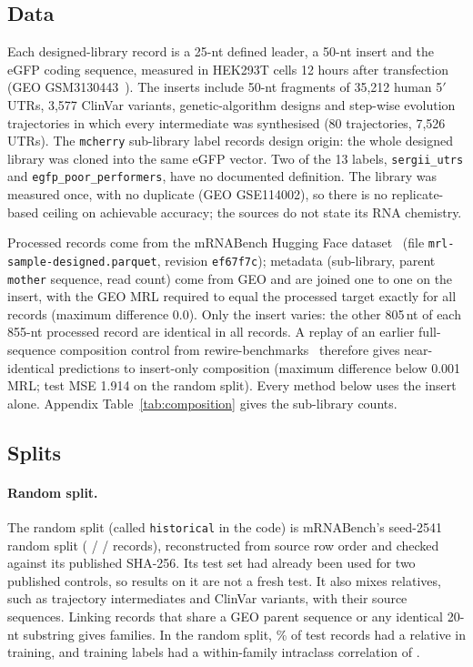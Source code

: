 \documentclass[11pt]{article}
\newcommand{\m}[1]{\texttt{#1}}
\begin{document}
\subsection{Data}\label{sec:data}
Each designed-library record is a 25-nt defined leader, a 50-nt insert and the eGFP coding sequence, measured in
HEK293T cells 12 hours after transfection (GEO GSM3130443~\citep{geo_gse114002}). The inserts include 50-nt
fragments of 35,212 human 5$'$UTRs, 3,577 ClinVar variants, genetic-algorithm designs and step-wise evolution
trajectories in which every intermediate was synthesised (80 trajectories, 7,526 UTRs). The \m{mcherry}
sub-library label records design origin: the whole designed library was cloned into the same eGFP vector. Two
of the 13 labels, \m{sergii\_utrs} and \m{egfp\_poor\_performers}, have no documented definition. The library was
measured once, with no duplicate (GEO GSE114002), so there is no replicate-based ceiling on achievable accuracy;
the sources do not state its RNA chemistry.

Processed records come from the mRNABench Hugging Face dataset~\citep{hf_mrlsample} (file \m{mrl-sample-\allowbreak designed.parquet}, revision \m{ef67f7c}); metadata (sub-library, parent \m{mother} sequence, read count) come from GEO and are joined
one to one on the insert, with the GEO MRL required to equal the processed target exactly for all \Records{}
records (maximum difference 0.0). Only the insert varies: the other 805\,nt of each 855-nt processed record are
identical in all records. A replay of an earlier full-sequence composition control from
rewire-benchmarks~\citep{rb_ca73fa4} therefore gives near-identical predictions to insert-only composition
(maximum difference below 0.001 MRL; test MSE 1.914 on the random split). Every method below uses the insert alone.
Appendix Table~\ref{tab:composition} gives the sub-library counts.

\subsection{Splits}\label{sec:splits}
\paragraph{Random split.} The random split (called \m{historical} in the code) is mRNABench's seed-2541 random
split (\RandTrain{} / \RandVal{} / \RandTest{} records), reconstructed from source row order and checked
against its published SHA-256. Its test set had already been used for two published controls, so results on it
are not a fresh test. It also mixes relatives, such as trajectory intermediates and ClinVar variants, with their
source sequences. Linking records that share a GEO parent sequence or any identical 20-nt substring gives
\Components{} families. In the random split, \OverlapShare\% of test records had a relative in training, and
training labels had a within-family intraclass correlation of \ICC.
\end{document}
